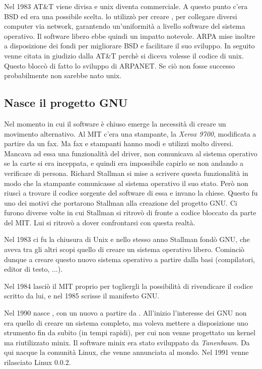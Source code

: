 Nel 1983 AT\&T viene divisa e unix diventa commerciale. A questo punto c'era BSD ed era una possibile scelta.  lo utilizzò per creare , per collegare diversi computer via network, garantendo un'uniformità a livello software del sistema operativo. Il software libero ebbe quindi un impatto notevole. ARPA mise inoltre a disposizione dei fondi per migliorare BSD e facilitare il suo sviluppo. In seguito venne citata in giudizio dalla AT\&T perchè si diceva volesse il codice di unix. Questo bloccò di fatto lo sviluppo di ARPANET. Se ciò non fosse successo probabilmente non sarebbe nato unix.

\subsection{Nasce il progetto GNU}

Nel momento in cui il software è chiuso emerge la necessità di creare un movimento alternativo. Al MIT c'era una stampante, la \textit{Xerox 9700}, modificata a partire da un fax. Ma fax e stampanti hanno modi e utilizzi molto diversi. Mancava ad essa una funzionalità del driver, non comunicava al sistema operativo se la carte si era inceppata, e quindi era impossibile capirlo se non andando a verificare di persona. Richard Stallman si mise a scrivere questa funzionalità in modo che la stampante comunicasse al sistema operativo il suo stato. Però non riuscì a trovare il codice sorgente del software di essa e invano la chiese. Questo fu uno dei motivi che portarono Stallman alla creazione del progetto GNU. Ci furono diverse volte in cui Stallman si ritrovò di fronte a codice bloccato da parte del MIT. Lui si ritrovò a dover confrontarsi con questa realtà.

Nel 1983 ci fu la chiusura di Unix e nello stesso anno Stallman fondò GNU, che aveva tra gli altri scopi quello di creare un sistema operativo libero. Cominciò dunque a creare questo nuovo sistema operativo a partire dalla basi (compilatori, editor di testo, ...).

Nel 1984 lasciò il MIT proprio per togliergli la possibilità di rivendicare il codice scritto da lui, e nel 1985 scrisse il manifesto GNU.

Nel 1990 nasce , con un nuovo  a partire da . All'inizio l'interesse dei GNU non era quello di creare un sistema completo, ma voleva mettere a disposizione uno strumento fin da subito (in tempi rapidi), per cui non venne progettato un kernel ma riutilizzato minix. Il software minix era stato sviluppato da \textit{Tanenbaum}. Da qui nacque la comunità Linux, che venne annunciata al mondo. Nel 1991 venne rilasciato Linux 0.0.2.

